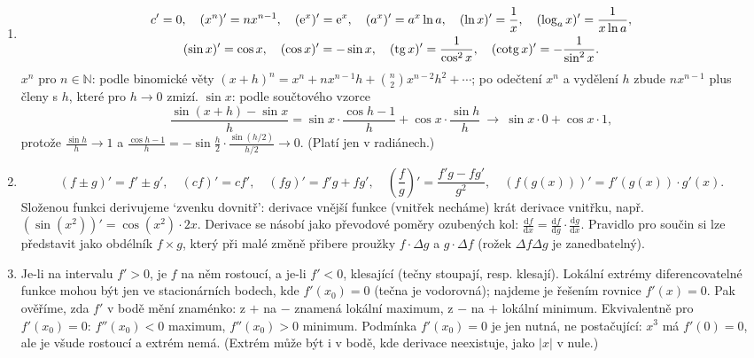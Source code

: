 \begin{enumerate}[label=\textbf{\arabic*.}, leftmargin=*, itemsep=0.8em]
  \item {}
  \begin{gather*}
    c' = 0,\quad (x^n)' = nx^{n-1},\quad (\mathrm{e}^x)' = \mathrm{e}^x,\quad (a^x)' = a^x\ln a,\quad (\ln x)' = \frac{1}{x},\quad (\log_a x)' = \frac{1}{x\ln a},\\
    (\sin x)' = \cos x,\quad (\cos x)' = -\sin x,\quad (\operatorname{tg} x)' = \frac{1}{\cos^2 x},\quad (\operatorname{cotg} x)' = -\frac{1}{\sin^2 x}.
  \end{gather*}
  $x^n$ pro $n\in\mathbb{N}$: podle binomické věty ${(x + h)}^n = x^n + nx^{n-1}h + \binom{n}{2}x^{n-2}h^2 + \cdots$; po odečtení $x^n$ a vydělení $h$ zbude $nx^{n-1}$ plus členy s $h$, které pro $h\to 0$ zmizí. $\sin x$: podle součtového vzorce
  \begin{equation*}
    \frac{\sin(x + h) - \sin x}{h} = \sin x\cdot\frac{\cos h - 1}{h} + \cos x\cdot\frac{\sin h}{h}\ \longrightarrow\ \sin x\cdot 0 + \cos x\cdot 1,
  \end{equation*}
  protože $\frac{\sin h}{h}\to 1$ a $\frac{\cos h - 1}{h} = -\sin\frac{h}{2}\cdot\frac{\sin(h/2)}{h/2}\to 0$. (Platí jen v radiánech.) 

  \item {}
  \begin{equation*}
    (f\pm g)' = f'\pm g', \quad (cf)' = cf', \quad (fg)' = f'g + fg', \quad \left(\frac{f}{g}\right)' = \frac{f'g - fg'}{g^2}, \quad \left(f(g(x))\right)' = f'(g(x))\cdot g'(x).
  \end{equation*}
  Složenou funkci derivujeme `zvenku dovnitř': derivace vnější funkce (vnitřek necháme) krát derivace vnitřku, např. $\left(\sin(x^2)\right)' = \cos(x^2)\cdot 2x$. Derivace se násobí jako převodové poměry ozubených kol: $\frac{\mathrm{d}f}{\mathrm{d}x} = \frac{\mathrm{d}f}{\mathrm{d}g}\cdot\frac{\mathrm{d}g}{\mathrm{d}x}$. Pravidlo pro součin si lze představit jako obdélník $f\times g$, který při malé změně přibere proužky $f\cdot\Delta g$ a $g\cdot\Delta f$ (rožek $\Delta f\Delta g$ je zanedbatelný). 

  \item {}
  Je-li na intervalu $f' > 0$, je $f$ na něm rostoucí, a je-li $f' < 0$, klesající (tečny stoupají, resp. klesají). Lokální extrémy diferencovatelné funkce mohou být jen ve stacionárních bodech, kde $f'(x_0) = 0$ (tečna je vodorovná); najdeme je řešením rovnice $f'(x) = 0$. Pak ověříme, zda $f'$ v bodě mění znaménko: z $+$ na $-$ znamená lokální maximum, z $-$ na $+$ lokální minimum. Ekvivalentně pro $f'(x_0) = 0$: $f''(x_0) < 0$ maximum, $f''(x_0) > 0$ minimum. Podmínka $f'(x_0) = 0$ je jen nutná, ne postačující: $x^3$ má $f'(0) = 0$, ale je všude rostoucí a extrém nemá. (Extrém může být i v bodě, kde derivace neexistuje, jako $|x|$ v nule.) 


\end{enumerate}
